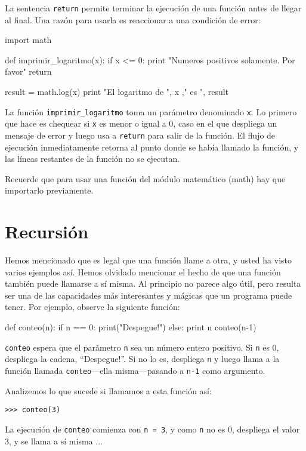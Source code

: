 La sentencia \texttt{return} permite terminar la ejecución de una función
antes de llegar al final. Una razón para usarla es reaccionar a una
condición de error:

\beforeverb
\begin{pythoncode}
import math

def imprimir_logaritmo(x):
  if x <= 0:
    print "Numeros positivos solamente. Por favor"
    return

  result = math.log(x)
  print "El logaritmo de ",  x ," es ", result
\end{pythoncode}
\afterverb
%

La función \texttt{imprimir\_logaritmo} toma un parámetro
denominado \texttt{x}.  Lo primero que hace es chequear si 
\texttt{x} es menor o igual a 0, caso en el que despliega un 
mensaje de error y luego usa a \texttt{return} para salir de la función.
El flujo de ejecución inmediatamente retorna al punto donde se había llamado
la función, y las líneas restantes de la función no se ejecutan.

Recuerde que para usar una función del módulo matemático (math)
hay que importarlo previamente.


\section{Recursión}
\label{recursion}

Hemos mencionado que es legal que una función llame a otra, y usted
ha visto varios ejemplos así. Hemos olvidado mencionar el hecho de 
que una función también puede llamarse a sí misma. Al principio no parece
algo útil, pero resulta ser una de las capacidades más interesantes y
mágicas que un programa puede tener. Por ejemplo, observe la siguiente
función:

\beforeverb
\begin{pythoncode}
def conteo(n):
  if n == 0:
    print("Despegue!")
  else:
    print n
    conteo(n-1)
\end{pythoncode}
\afterverb
%

\texttt{conteo} espera que el parámetro \texttt{n} sea un número entero 
positivo.
Si  \texttt{n} es 0, despliega la cadena, ``Despegue!''.
Si no lo es, despliega  \texttt{n} y luego llama a la función llamada
\texttt{conteo}---ella misma---pasando a  \texttt{n-1} como argumento.

Analizemos lo que sucede si llamamos a esta función así:

\beforeverb
\begin{verbatim}
>>> conteo(3)
\end{verbatim}
\afterverb
%
La ejecución de \texttt{conteo} comienza con \texttt{n = 3}, y como
\texttt{n} no es  0, despliega el valor 3, y se llama a sí misma ...

